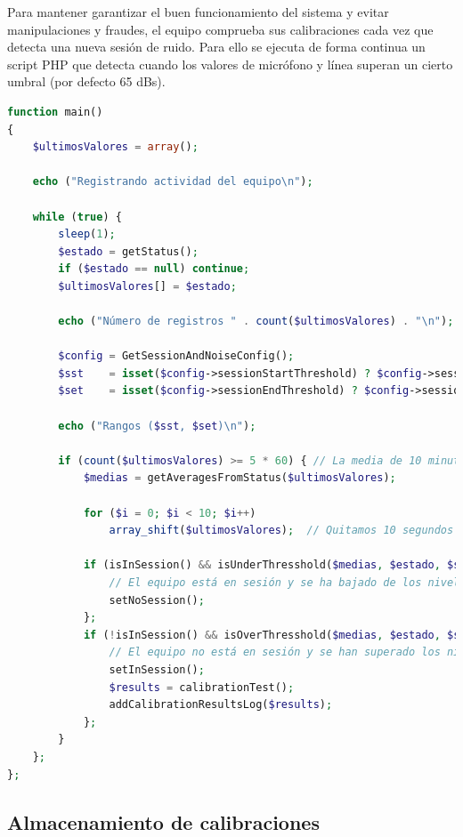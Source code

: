 Para mantener garantizar el buen funcionamiento del sistema y evitar manipulaciones y fraudes, el equipo comprueba sus calibraciones cada vez que detecta una nueva sesión de ruido. Para ello se ejecuta de forma continua un script PHP que detecta cuando los valores de micrófono y línea superan un cierto umbral (por defecto 65 dBs). \\

\begin{lstlisting}[language=php, caption=Script de control de sesiones.]
function main()
{
    $ultimosValores = array();

    echo ("Registrando actividad del equipo\n");

    while (true) {
        sleep(1);
        $estado = getStatus();
        if ($estado == null) continue;
        $ultimosValores[] = $estado;

        echo ("Número de registros " . count($ultimosValores) . "\n");

        $config = GetSessionAndNoiseConfig();
        $sst    = isset($config->sessionStartThreshold) ? $config->sessionStartThreshold : 65;
        $set    = isset($config->sessionEndThreshold) ? $config->sessionEndThreshold : 65;

        echo ("Rangos ($sst, $set)\n");

        if (count($ultimosValores) >= 5 * 60) { // La media de 10 minutos
            $medias = getAveragesFromStatus($ultimosValores);

            for ($i = 0; $i < 10; $i++)
                array_shift($ultimosValores);  // Quitamos 10 segundos de lecturas

            if (isInSession() && isUnderThresshold($medias, $estado, $set)) {
                // El equipo está en sesión y se ha bajado de los niveles
                setNoSession();
            };
            if (!isInSession() && isOverThresshold($medias, $estado, $sst)) {
                // El equipo no está en sesión y se han superado los niveles.
                setInSession();
                $results = calibrationTest();
                addCalibrationResultsLog($results);
            };
        }
    };
};
\end{lstlisting}

\subsection{Almacenamiento de calibraciones}

